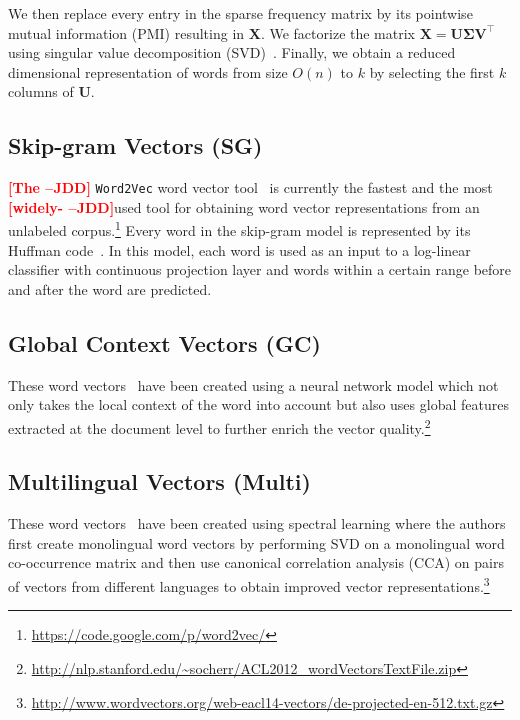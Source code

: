 \documentclass[11pt]{article}
\newcommand{\jdd}[1]{\textcolor{red}{\bf\small [#1 --JDD]}}
\begin{document}
We then replace every entry in the sparse frequency matrix by 
its pointwise mutual information (PMI) \cite{Church:1990:WAN:89086.89095,Turney:2001:MWS:645328.650004}
resulting in $\boldsymbol{X}$.
We factorize the matrix $\boldsymbol{X} = \boldsymbol{U} \boldsymbol{\Sigma} \boldsymbol{V}^{\top}$ using singular value decomposition (SVD)~\cite{Golub:1996:MC:248979}. Finally, we obtain a reduced dimensional
representation of words from size $O(n)$ to $k$ by selecting the first $k$ columns of $\boldsymbol{U}$.

\subsection{Skip-gram Vectors (SG)}
\label{sec:sg}

\jdd{The} \texttt{Word2Vec} word vector tool~\cite{mikolov2013efficient} is currently the fastest and 
the most \jdd{widely-}used tool for obtaining word 
vector representations from an unlabeled 
corpus.\footnote{\url{https://code.google.com/p/word2vec/}}
Every word in the skip-gram model is represented by its Huffman code~\cite{citeulike:1320251}. In 
this model, each  word is used as an input to a log-linear classifier
with continuous projection layer and words within a certain range before and after the word
are predicted. 

\subsection{Global Context Vectors (GC)}
\label{sec:gc}

These word vectors~\cite{huang2012improving} have been created using a neural network model which not only takes the local context of the word into account but also uses global features extracted at the document level to further enrich the vector quality.\footnote{\url{http://nlp.stanford.edu/~socherr/ACL2012_wordVectorsTextFile.zip}}

\subsection{Multilingual Vectors (Multi)}
\label{sec:multi}

These word vectors~\cite{faruqui-dyer:2014:EACL2014} have been created using spectral learning where the authors first create monolingual word vectors by performing SVD on a monolingual word co-occurrence matrix and then use canonical correlation analysis (CCA) on pairs of vectors from different languages to obtain improved vector representations.\footnote{\url{http://www.wordvectors.org/web-eacl14-vectors/de-projected-en-512.txt.gz}}
\end{document}
